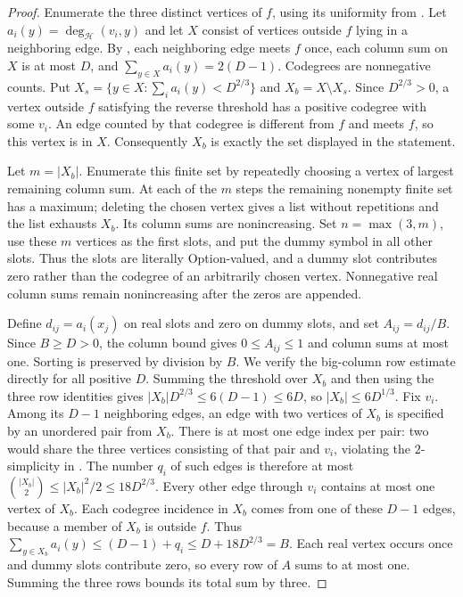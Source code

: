 \begin{proof}
Enumerate the three distinct vertices of $f$, using its uniformity from
. Let $a_i(y)=\deg_{\mathcal H}(v_i,y)$ and
let $X$ consist of vertices outside $f$ lying in a neighboring edge.
By , each neighboring edge meets $f$ once,
each column sum on $X$ is at most $D$, and
$\sum_{y\in X}a_i(y)=2(D-1)$. Codegrees are nonnegative counts.
Put $X_s=\{y\in X:\sum_i a_i(y)<D^{2/3}\}$ and $X_b=X\setminus X_s$.
Since $D^{2/3}>0$, a vertex outside $f$ satisfying the reverse threshold
has a positive codegree with some $v_i$. An edge counted by that codegree
is different from $f$ and meets $f$, so this vertex is in $X$.
Consequently $X_b$ is exactly the set displayed in the statement.

Let $m=|X_b|$. Enumerate this finite set by repeatedly choosing a vertex of
largest remaining column sum. At each of the $m$ steps the remaining
nonempty finite set has a maximum; deleting the chosen vertex gives a
list without repetitions and the list exhausts $X_b$. Its column sums
are nonincreasing. Set $n=\max(3,m)$, use these $m$ vertices as the first
slots, and put the dummy symbol in all other slots. Thus the slots are
literally Option-valued, and a dummy slot contributes zero rather than
the codegree of an arbitrarily chosen vertex. Nonnegative real column sums
remain nonincreasing after the zeros are appended.

Define $d_{ij}=a_i(x_j)$ on real slots and zero on dummy slots, and set
$A_{ij}=d_{ij}/B$. Since $B\ge D>0$, the column bound gives
$0\le A_{ij}\le1$ and column sums at most one. Sorting is preserved by
division by $B$. We verify the big-column row estimate directly for all
positive $D$. Summing the threshold over $X_b$ and then using the three
row identities gives $|X_b|D^{2/3}\le6(D-1)\le6D$, so
$|X_b|\le6D^{1/3}$. Fix $v_i$. Among its $D-1$ neighboring edges, an
edge with two vertices of $X_b$ is specified by an unordered pair from
$X_b$. There is at most one edge index per pair: two would share the
three vertices consisting of that pair and $v_i$, violating the
$2$-simplicity in . The number $q_i$ of such
edges is therefore at most $\binom{|X_b|}{2}\le |X_b|^2/2\le18D^{2/3}$.
Every other edge through $v_i$ contains at most one vertex of $X_b$.
Each codegree incidence in $X_b$ comes from one of these $D-1$ edges,
because a member of $X_b$ is outside $f$. Thus
$\sum_{y\in X_b}a_i(y)\le(D-1)+q_i\le D+18D^{2/3}=B$.
Each real vertex occurs once and dummy slots contribute zero, so every
row of $A$ sums to at most one. Summing the three rows bounds its total
sum by three.


\end{proof}
